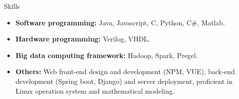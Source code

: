 \documentclass{resume} %
\begin{document}
\begin{rSection}{Skills}
    \begin{itemize}[leftmargin=0pt,itemsep=-0.3em] 
        \item {\bf Software programming: }
        Java, Javascript,  C, Python, C\#,  Matlab.
        \item {\bf Hardware programming: }
        Verilog, VHDL.
        \item {\bf Big data computing framework: }
        Hadoop, Spark, Pregel.
        \item {\bf Others: }
        Web front-end design and development (NPM, VUE), back-end development (Spring boot, Django) and server deployment, proficient in Linux operation system and mathematical modeling.
    \end{itemize}
\end{rSection}
\end{document}
